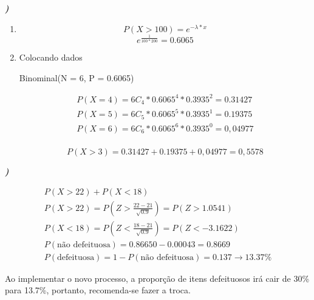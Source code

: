 \documentclass[12pt]{article}
\newcounter{instn}
\newcommand{\instnum}{\arabic{instn}}
\newcommand{\myline}[1]{
    \emph{\textbf{#1)}}
    \addtocounter{instn}{1}
}
\newenvironment{question}
 {
    \myline{\instnum} 
    }
    {
 }
\begin{document}
    \begin{question}
        \begin{enumerate}[label={\textbf{\alph*)}}]
            \item
            \[
                P(X>100) = e^{-\lambda * x}   
            \]
            \begin{equation}
                e^{\frac{1}{100*200}} = 0.6065
            \end{equation}
            \item Colocando dados 
            \begin{center}
                Binominal(N = 6, P = 0.6065) \\ 
            \end{center}

            \begin{align*}
                P(X=4) =6C_4*0.6065^{4}*0.3935^{2}=0.31427 \\
                P(X=5) =6C_5*0.6065^{5}*0.3935^{1}=0.19375 \\
                P(X=6) =6C_6*0.6065^{6}*0.3935^{0}=0,04977 \\
            \end{align*}

            \begin{equation}
                P(X>3) = 0.31427 + 0.19375 + 0,04977 = 0,5578
            \end{equation}

        \end{enumerate}
    \end{question}


    \begin{question}
        \begin{align*}
            P(X > 22) + P(X < 18) \\ 
            P(X > 22) = P(Z > \frac{22 - 21}{\sqrt{0.9}}) = P(Z > 1.0541) \\ 
            P(X < 18) = P(Z < \frac{18-21}{\sqrt{0.9}}) = P(Z < -3.1622) \\ 
            P(\text{não defeituosa}) = 0.86650 - 0.00043 = 0.8669 \\ 
            P(\text{defeituosa}) = 1 - P(\text{não defeituosa}) = 0.137 \rightarrow 13.37\%
        \end{align*}

        Ao implementar o novo processo, a proporção de itens defeituosos irá cair de 30\% 
        para 13.7\%, portanto, recomenda-se fazer a troca.
    \end{question}
\end{document}
